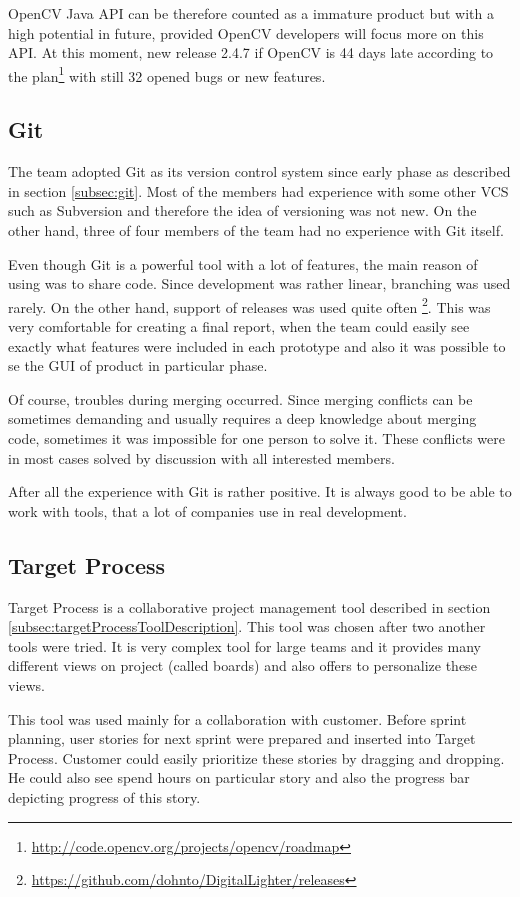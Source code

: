 OpenCV Java API can be therefore counted as a immature product but with a high potential in future, provided OpenCV developers will focus more on this API.
At this moment, new release 2.4.7 if OpenCV is 44 days late according to the plan\footnote{\url{http://code.opencv.org/projects/opencv/roadmap}} with still 32 opened bugs or new features.

\subsection{Git}
The team adopted Git as its version control system since early phase as described in section \ref{subsec:git}.
Most of the members had experience with some other VCS such as Subversion and therefore the idea of versioning was not new.
On the other hand, three of four members of the team had no experience with Git itself.

Even though Git is a powerful tool with a lot of features, the main reason of using was to share code.
Since development was rather linear, branching was used rarely.
On the other hand, support of releases was used quite often \footnote{\url{https://github.com/dohnto/DigitalLighter/releases}}.
This was very comfortable for creating a final report, when the team could easily see exactly what features were included in each prototype and also it was possible to se the GUI of product in particular phase.

Of course, troubles during merging occurred.
Since merging conflicts can be sometimes demanding and usually requires a deep knowledge about merging code, sometimes it was impossible for one person to solve it.
These conflicts were in most cases solved by discussion with all interested members.

After all the experience with Git is rather positive. 
It is always good to be able to work with tools, that a lot of companies use in real development.


\subsection{Target Process}
Target Process is a collaborative project management tool described in section \ref{subsec:targetProcessToolDescription}.
This tool was chosen after two another tools were tried.
It is very complex tool for large teams and it provides many different views on project (called boards) and also offers to personalize these views.

This tool was used mainly for a collaboration with customer. 
Before sprint planning, user stories for next sprint were prepared and inserted into Target Process.
Customer could easily prioritize these stories by dragging and dropping.
He could also see spend hours on particular story and also the progress bar depicting progress of this story.


